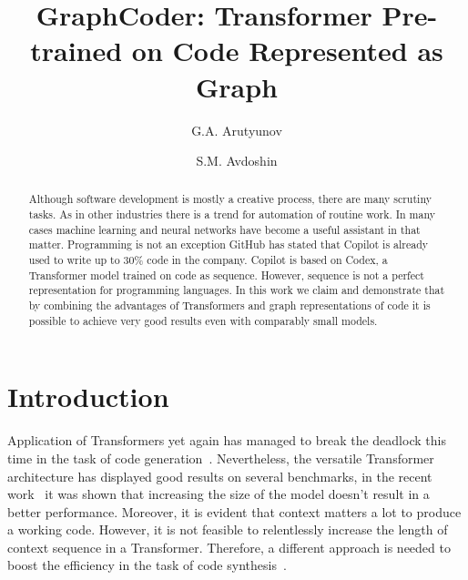 \documentclass[sigplan,natbib=false]{acmart}
\begin{document}
\author{G.A. Arutyunov}
\author{S.M. Avdoshin}

\title[GraphCoder]{GraphCoder: Transformer Pre-trained on Code Represented as Graph}

\begin{abstract}
    Although software development is mostly a creative process, there are many scrutiny tasks.
    As in other industries there is a trend for automation of routine work.
    In many cases machine learning and neural networks have become a useful assistant in that matter.
    Programming is not an exception \textendash GitHub has stated that Copilot is already used to write up to 30\% code in the company.
    Copilot is based on Codex, a Transformer model trained on code as sequence.
    However, sequence is not a perfect representation for programming languages.
    In this work we claim and demonstrate that by combining the advantages of Transformers
    and graph representations of code it is possible to achieve very good results even with comparably small models.
\end{abstract}


\maketitle

\section{Introduction}\label{sec:introduction}

Application of Transformers yet again has managed to break the deadlock \textemdash this time in the task of code generation~\cite{hendrycks_measuring_2021,chen_evaluating_2021,li_competition-level_nodate,nijkamp_conversational_2022}.
Nevertheless, the versatile Transformer architecture has displayed good results on several benchmarks,
in the recent work~\cite{xu_systematic_2022} it was shown that increasing the size of the model doesn't result in a better performance.
Moreover, it is evident that context matters a lot to produce a working code.
However, it is not feasible to relentlessly increase the length of context sequence in a Transformer.
Therefore, a different approach is needed to boost the efficiency in the task of code synthesis~\cite{arutyunov_big_2022}.
\end{document}
